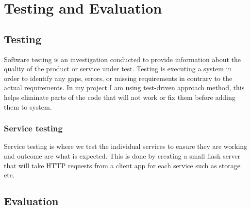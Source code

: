 \chapter{Testing and Evaluation}

\section{Testing}

Software testing is an investigation conducted to provide information about the quality of the product or service under test. Testing is executing a system in order to identify any gaps, errors, or missing requirements in contrary to the actual requirements. In my project I am using test-driven approach method, this helps eliminate parts of the code that will not work or fix them before adding them to system.

\subsection{Service testing}

Service testing is where we test the individual services to ensure they are working and outcome are what is expected. This is done by creating a small flask server that will take HTTP requests from a client app for each service such as storage etc. 

\section{Evaluation}

